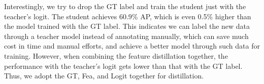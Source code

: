 \documentclass[10pt,twocolumn,letterpaper]{article}
\begin{document}
Interestingly, we try to drop the GT label and train the student just with the teacher's logit. The student achieves 60.9\% AP, which is even 0.5\% higher than the model trained with the GT label. This indicates we can label the new data through a teacher model instead of annotating manually, which can save much cost in time and manual efforts, and achieve a better model through such data for training. However, when combining the feature distillation together, the performance with the teacher's logit gets lower than that with the GT label. Thus, we adopt the GT, Fea, and Logit together for distillation.

\begin{table}[h]
  \centering
  \setlength{\tabcolsep}{10 pt}
  \vspace{0.1cm}
  \caption{Ablation study of the components of first-stage distillation. The teacher and student are RTMPose-l and RTMPose-m. The performance is the whole-body AP on COCO with GT boxes.}
  \label{table:fea logit}
  \vspace{-0.2cm}
\end{table}

\begin{table}[h]
  \centering
  \setlength{\tabcolsep}{15 pt}
  \vspace{0.1cm}
  \caption{Ablation study of the target weight mask. The teacher and student is RTMPose-l and RTMPose-m. The performance is the whole-body AP on COCO with GT boxes.}
  \label{table:mask}
  \vspace{-0.2cm}
\end{table}
\end{document}
